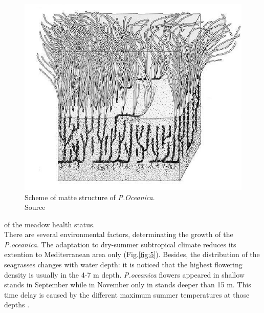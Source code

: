\documentclass[10pt, a4paper]{article}
\begin{document}
\begin{figure}
	\centering
	\includegraphics[scale=0.15]{Fig-1-7.jpg}
	\caption{Scheme of matte structure of \textit{	P.Oceanica}.\\ Source \cite{Pergent90}\label{Pergent90}}
	\label{fig:7}
\end{figure}

of the meadow health status. \\
There are several environmental factors, determinating the growth of the \textit{P.oceanica}. The adaptation
to dry-summer subtropical climate reduces its extention to Mediterranean area only (Fig.\ref{fig:5}).
Besides, the distribution of the seagrasses changes with water depth: it is noticed \cite{Dural10}\label{Dural10} that
the highest flowering density is usually in the 4-7 m depth. 
\textit{P.oceanica} flowers appeared in shallow
stands in September while in November only in stands deeper than 15 m. This time delay is caused by
the different maximum summer temperatures at those depths \cite{Buia91}\label{Buia91}.
\end{document}
